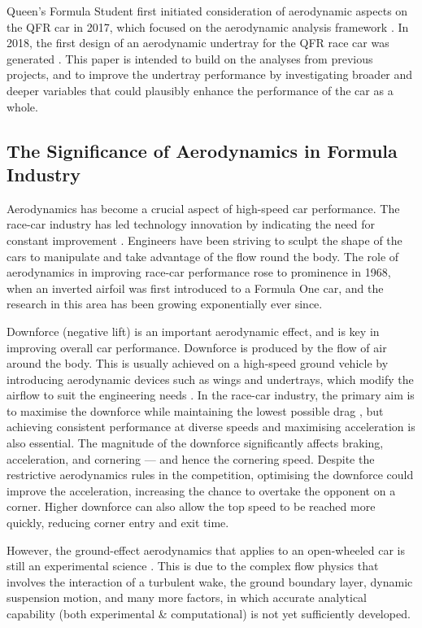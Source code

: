 \noindent Queen's Formula Student first initiated consideration of aerodynamic aspects on the QFR car in 2017, which focused on the aerodynamic analysis framework \cite{Corr2017MechanicalAuthor}. In 2018, the first design of an aerodynamic undertray for the QFR race car was generated \cite{McKeown2018DesignCar}. This paper is intended to build on the analyses from previous projects, and to improve the undertray performance by investigating broader and deeper variables that could plausibly enhance the performance of the car as a whole. 

\subsection{The Significance of Aerodynamics in Formula Industry}
Aerodynamics has become a crucial aspect of high-speed car performance. The race-car industry has led technology innovation by indicating the need for constant improvement \cite{Zhang2006GroundCars}. Engineers have been striving to sculpt the shape of the cars to manipulate and take advantage of the flow round the body. The role of aerodynamics in improving race-car performance rose to prominence in 1968, when an inverted airfoil was first introduced to a Formula One car, and the research in this area has been growing exponentially ever since.


\noindent Downforce (negative lift) is an important aerodynamic effect, and is key in improving overall car performance. Downforce is produced by the flow of air around the body. This is usually achieved on a high-speed ground vehicle by introducing aerodynamic devices such as wings and undertrays, which modify the airflow to suit the engineering needs \cite{Wright1982TheCars}. In the race-car industry, the primary aim is to maximise the downforce while maintaining the lowest possible drag \cite{Zhang2006GroundCars}, but achieving consistent performance at diverse speeds and maximising acceleration is also essential. The magnitude of the downforce significantly affects braking, acceleration, and cornering --- and hence the cornering speed. Despite the restrictive aerodynamics rules in the competition, optimising the downforce could improve the acceleration, increasing the chance to overtake the opponent on a corner. Higher downforce can also allow the top speed to be reached more quickly, reducing corner entry and exit time. 

\noindent However, the ground-effect aerodynamics that applies to an open-wheeled car is still an experimental science \cite{Zhang2006GroundCars}. This is due to the complex flow physics that involves the interaction of a turbulent wake, the ground boundary layer, dynamic suspension motion, and many more factors, in which accurate analytical capability (both experimental \& computational) is not yet sufficiently developed.

